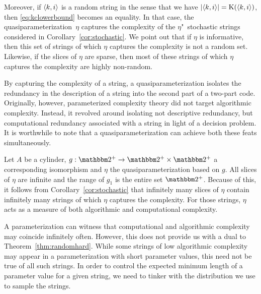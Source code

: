 Moreover, if ${\langle k, i\rangle}$ is a random string in the sense that we have ${\lvert{\langle k, i\rangle}\rvert} = \operatorname{K}({\langle k, i\rangle})$, then \eqref{eq:kclowerbound} becomes an equality.
In that case, the quasiparameterization~$\eta$ captures the complexity of the $\eta$"~stochastic strings considered in Corollary~\ref{cor:stochastic}.
We point out that if $\eta$ is informative, then this set of strings of which $\eta$ captures the complexity is not a random set.
Likewise, if the slices of $\eta$ are sparse, then most of these strings of which $\eta$ captures the complexity are highly non-random.

\begin{example}[continued]
\label{ex:simultaneous}%
  By capturing the complexity of a string, a quasiparameterization isolates the redundancy in the description of a string into the second part of a two-part code.
  Originally, however, parameterized complexity theory did not target algorithmic complexity.
  Instead, it revolved around isolating not descriptive redundancy, but computational redundancy associated with a string in light of a decision problem.
  It is worthwhile to note that a quasiparameterization can achieve both these feats simultaneously.

  Let $A$ be a \pdash{}cylinder, $g : \binary^+ \to \binary^+ \times \binary^+$ a corresponding isomorphism and $\eta$ the quasiparameterization based on $g$.
  All slices of $\eta$ are infinite and the range of $g_1$ is the entire set $\binary^+$.
  Because of this, it follows from Corollary~\ref{cor:stochastic} that infinitely many slices of $\eta$ contain infinitely many strings of which $\eta$ captures the complexity.
  For those strings, $\eta$ acts as a measure of both algorithmic and computational complexity.
\end{example}

A parameterization can witness that computational and algorithmic complexity may coincide infinitely often.
However, this does not provide us with a dual to Theorem~\ref{thm:randomhard}.
While some strings of low algorithmic complexity may appear in a parameterization with short parameter values, this need not be true of all such strings.
In order to control the expected minimum length of a parameter value for a given string, we need to tinker with the distribution we use to sample the strings.

